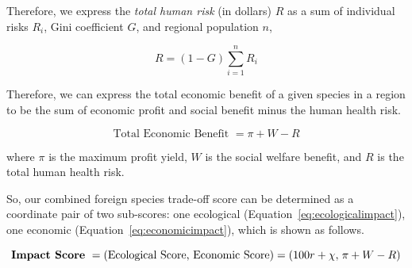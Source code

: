 Therefore, we express the \textit{total human risk} (in dollars) \(R\) as a sum of individual risks \(R_i\), Gini coefficient \(G\), and regional population \(n\),

\begin{equation}
    R = (1 - G) \sum_{i=1}^n R_i 
\end{equation}

Therefore, we can express the total economic benefit of a given species in a region to be the sum of economic profit and social benefit minus the human health risk.

\begin{equation}
    \text{Total Economic Benefit } = \pi + W - R
    \label{eq:economicimpact}
\end{equation}

where \(\pi\) is the maximum profit yield, \(W\) is the social welfare benefit, and \(R\) is the total human health risk. 

So, our combined foreign species trade-off score can be determined as a coordinate pair of two sub-scores: one ecological (Equation~\ref{eq:ecologicalimpact}), one economic (Equation~\ref{eq:economicimpact}), which is shown as follows.

\begin{equation}
    \text{\textbf{Impact Score} } = (\text{Ecological Score, Economic Score}) = (100r + \chi, \hspace{0.05cm} \pi + W - R)
\end{equation}